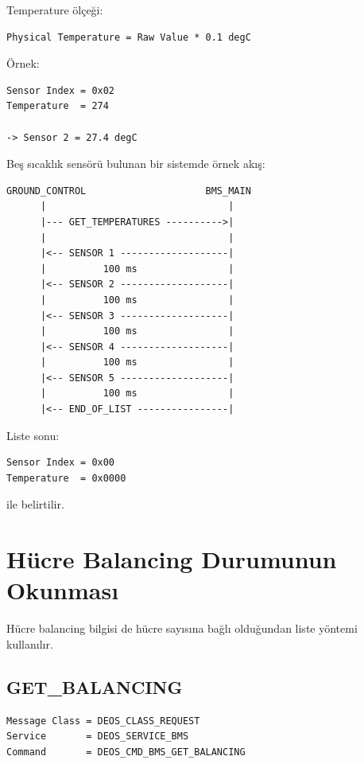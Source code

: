 \documentclass[a4paper,10pt]{article}
\begin{document}
Temperature ölçeği:

\begin{lstlisting}
Physical Temperature = Raw Value * 0.1 degC
\end{lstlisting}

Örnek:

\begin{lstlisting}
Sensor Index = 0x02
Temperature  = 274

-> Sensor 2 = 27.4 degC
\end{lstlisting}

Beş sıcaklık sensörü bulunan bir sistemde örnek akış:

\begin{lstlisting}
GROUND_CONTROL                     BMS_MAIN
      |                                |
      |--- GET_TEMPERATURES ---------->|
      |                                |
      |<-- SENSOR 1 -------------------|
      |          100 ms                |
      |<-- SENSOR 2 -------------------|
      |          100 ms                |
      |<-- SENSOR 3 -------------------|
      |          100 ms                |
      |<-- SENSOR 4 -------------------|
      |          100 ms                |
      |<-- SENSOR 5 -------------------|
      |          100 ms                |
      |<-- END_OF_LIST ----------------|
\end{lstlisting}

Liste sonu:

\begin{lstlisting}
Sensor Index = 0x00
Temperature  = 0x0000
\end{lstlisting}

ile belirtilir.

\section{Hücre Balancing Durumunun Okunması}

Hücre balancing bilgisi de hücre sayısına bağlı olduğundan liste
yöntemi kullanılır.

\subsection{GET\_BALANCING}

\begin{lstlisting}
Message Class = DEOS_CLASS_REQUEST
Service       = DEOS_SERVICE_BMS
Command       = DEOS_CMD_BMS_GET_BALANCING
\end{lstlisting}
\end{document}
